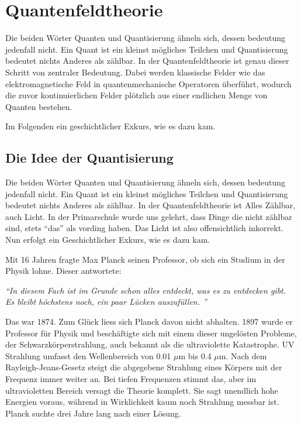 %
%
%
%
\section{Quantenfeldtheorie\label{fourier:section:quantenfeldtheorie}}
Die beiden Wörter Quanten und Quantisierung ähneln sich, dessen bedeutung jedenfall nicht. 
Ein Quant ist ein kleinst mögliches Teilchen und Quantisierung bedeutet nichts Anderes als zählbar. 
In der Quantenfeldtheorie ist genau dieser Schritt von zentraler Bedeutung. 
Dabei werden klassische Felder wie das elektromagnetische Feld in quantenmechanische Operatoren überführt, wodurch die zuvor kontinuierlichen Felder plötzlich aus einer endlichen Menge von Quanten bestehen.


Im Folgenden ein geschichtlicher Exkurs, wie es dazu kam. 




\subsection{Die Idee der Quantisierung\label{fourier:subsection:DieIdeeDerQuantisierung}}
	
	Die beiden Wörter Quanten und Quantisierung ähneln sich, dessen bedeutung jedenfall nicht.
	Ein Quant ist ein kleinst mögliches Teilchen und Quantisierung bedeutet nichts Anderes als zählbar.
	In der Quantenfeldtheorie ist Alles Zählbar, auch Licht. In der Primarschule wurde uns gelehrt, dass Dinge die nicht zählbar sind, stets ``das'' als vording haben.
	Das Licht ist also offensichtlich inkorrekt. Nun erfolgt ein  Geschichtlicher Exkurs, wie es dazu kam. 
	
	Mit 16 Jahren fragte Max Planck seinen Professor, ob sich ein Studium in der Physik lohne. 
	Dieser antwortete:
	
	\begin{center}
		\textit{``{}In diesem Fach ist im Grunde schon alles entdeckt, was es zu entdecken gibt.\\
			Es bleibt höchstens noch, ein paar Lücken auszufüllen. ''}
	\end{center}
	
	Das war 1874. 
	Zum Glück liess sich Planck davon nicht abhalten.
	1897 wurde er Professor für Physik und beschäftigte sich mit einem dieser ungelösten Probleme, der Schwarzkörperstrahlung, auch bekannt als die ultraviolette Katastrophe. 
	UV Strahlung umfasst den Wellenbereich von 0.01 $\mu$m bis 0.4 $\mu$m.
	Nach dem Rayleigh-Jeans-Gesetz steigt die abgegebene Strahlung eines Körpers mit der Frequenz immer weiter an. Bei tiefen Frequenzen stimmt das, aber im ultravioletten Bereich versagt die Theorie komplett. 
	Sie sagt unendlich hohe Energien voraus, während in Wirklichkeit kaum noch Strahlung messbar ist.
	Planck suchte drei Jahre lang nach einer Lösung. 
	
